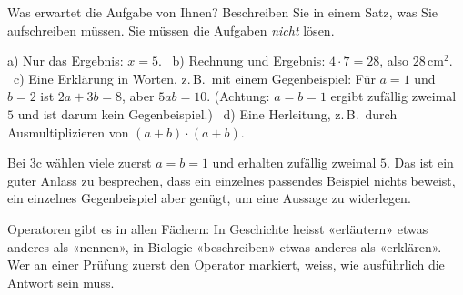 \documentclass[11pt]{exam}
\begin{document}
\begin{questions}
\question Was erwartet die Aufgabe von Ihnen? Beschreiben Sie in einem Satz,
was Sie aufschreiben müssen. Sie müssen die Aufgaben \emph{nicht} lösen.
\begin{solution}
  a) Nur das Ergebnis: $x = 5$. \
  b) Rechnung und Ergebnis: $4 \cdot 7 = 28$, also $28$\,cm$^2$. \
  c) Eine Erklärung in Worten, z.\,B.\ mit einem Gegenbeispiel: Für $a = 1$
  und $b = 2$ ist $2a + 3b = 8$, aber $5ab = 10$. (Achtung: $a = b = 1$ ergibt
  zufällig zweimal $5$ und ist darum kein Gegenbeispiel.) \
  d) Eine Herleitung, z.\,B.\ durch Ausmultiplizieren von $(a + b) \cdot (a + b)$.
\end{solution}
\raum{3.5cm}

\end{questions}

\begin{lehrperson}[Übung 3c]
Bei 3c wählen viele zuerst $a = b = 1$ und erhalten zufällig zweimal $5$. Das ist ein guter Anlass zu besprechen, dass ein
einzelnes passendes Beispiel nichts beweist, ein einzelnes Gegenbeispiel aber
genügt, um eine Aussage zu widerlegen.
\end{lehrperson}

\begin{transfer}
Operatoren gibt es in allen Fächern: In Geschichte heisst «erläutern» etwas
anderes als «nennen», in Biologie «beschreiben» etwas anderes als
«erklären». Wer an einer Prüfung zuerst den Operator markiert, weiss, wie
ausführlich die Antwort sein muss.
\end{transfer}
\end{document}
